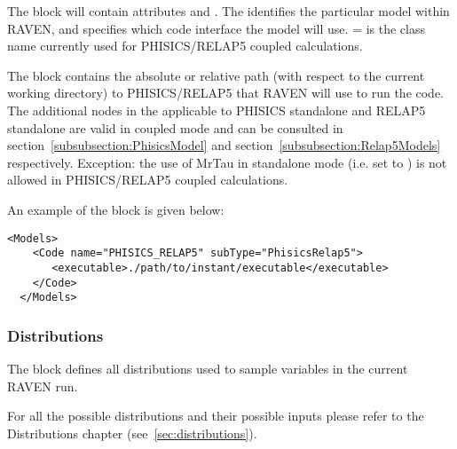 The  block will contain attributes  and .
The  identifies the particular  model within RAVEN, and 
specifies which code interface the model will use. = is the class name
currently used for PHISICS/RELAP5 coupled calculations.

The  block contains the absolute or relative path (with respect to the current working directory) to PHISICS/RELAP5
that RAVEN will use to run the code. The additional nodes in the  applicable to PHISICS standalone and RELAP5 standalone
are valid in coupled mode and can be consulted in section~\ref{subsubsection:PhisicsModel} and section~\ref{subsubsection:Relap5Models} respectively.
Exception: the use of MrTau in standalone mode (i.e.  set to ) is not allowed in PHISICS/RELAP5 coupled
calculations.

An example of the  block is given below:

\begin{lstlisting}[style=XML]
  <Models>
    <Code name="PHISICS_RELAP5" subType="PhisicsRelap5">
       <executable>./path/to/instant/executable</executable>
    </Code>
  </Models>
\end{lstlisting}
\subsubsection{Distributions}
The  block defines all distributions used to
sample variables in the current RAVEN run.

For all the possible distributions and their possible inputs please
refer to the Distributions chapter (see~\ref{sec:distributions}).
%
